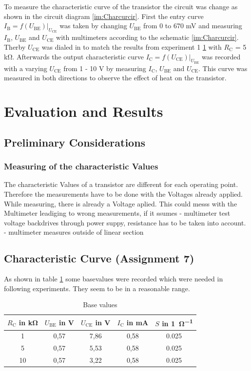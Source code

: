 \documentclass[11pt, a4paper]{article}
\begin{document}
To measure the characteristic curve of the transistor the circuit was change as shown in the circuit diagram \ref{im:Charcurcir}. 
First the entry curve $I_{\text{B}}=f(U_{\text{BE}})|_{U_{\text{CE}}}$ was taken by changing $U_{\text{BE}}$ from 0 to 670 \si{\milli\volt} and measuring $I_{\text{B}}$,
$U_{\text{BE}}$ and $U_{\text{CE}}$ with multimeters according to the schematic \ref{im:Charcurcir}. Therby $U_{\text{CE}}$ was dialed in to match the results from experiment 1 \ref{tab:operating point_measurement} with $R_{\text{C}}$ = 5 \si{\kilo\ohm}.
Afterwards the output characteristic curve $I_{\text{C}} = f(U_{\text{CE}})|_{U_{\text{BE}}}$ was recorded with a varying $U_{\text{CE}}$ from 1 - 10 \si{\volt} by measuring $I_{\text{C}}$, $U_{\text{BE}}$ and $U_{\text{CE}}$. This curve was measured in both directions to observe the effect of heat on the transistor.

\section{Evaluation and Results}
\subsection{Preliminary Considerations}

\subsubsection{Measuring of the characteristic Values}
The characteristic Values of a transistor are different for each operating point. Therefore the measurements have to be done with the Voltages already applied. While measuring, there is already a Voltage aplied. This could messs with the Multimeter leadiging to wrong measurements, if it ssumes
- multimeter test voltage backdrives through power suppy, resistance has to be taken into account.
- multimeter measures outside of linear section


\subsection{Characteristic Curve (Assignment 7)}
As shown in table \ref{tab:operating point_measurement} some basevalues were recorded which were needed in following experiments. They seem to be in a reasonable range.

\begin{table}[H]
    \centering
    \begin{tabular}{c|c|c|c|c}
    
        $R_{\text{C}}$ in \si{\kilo\ohm}  & $U_{\text{BE}}$ in \si{\volt} & $U_{\text{CE}}$ in \si{\volt} & $I_{\text{C}}$ in \si{\milli\ampere} & $S$ in \si{1\per\ohm} \\ \hline
        1 & 0,57 & 7,86 & 0,58 & 0.025\\ 
        5 & 0,57 & 5,53 & 0,58 & 0.025\\ 
        10 & 0,57 & 3,22 & 0,58 & 0.025\\ 
    \end{tabular}
    \label{tab:operating point_measurement}
    \caption{Base values}
\end{table}
\end{document}
